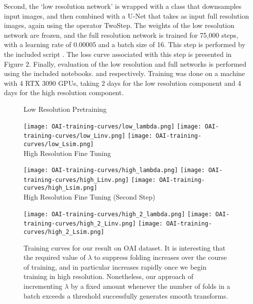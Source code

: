 Second, the `low resolution network' is wrapped with a class that downsamples input images, and then combined with a U-Net that takes as input full resolution images, again using the operator TwoStep. The weights of the low resolution network are frozen, and the full resolution network is trained for 75,000 steps, with a learning rate of $0.00005$ and a batch size of 16. This step is performed by the included script . The loss curve associated with this step is presented in Figure 2.
Finally, evaluation of the low resolution and full networks is performed using the included notebooks.   and  respectively. Training was done on a machine with 4 RTX 3090 GPUs, taking 2 days for the low resolution component and 4 days for the high resolution component.
\begin{figure}
    \centering
    Low Resolution Pretraining\par\medskip
    \texttt{[image: OAI-training-curves/low\_lambda.png]}
    \texttt{[image: OAI-training-curves/low\_Linv.png]}
    \texttt{[image: OAI-training-curves/low\_Lsim.png]} \\
    High Resolution Fine Tuning\par\medskip
    \texttt{[image: OAI-training-curves/high\_lambda.png]}
    \texttt{[image: OAI-training-curves/high\_Linv.png]}
    \texttt{[image: OAI-training-curves/high\_Lsim.png]} \\
    High Resolution Fine Tuning (Second Step)\par\medskip
    \texttt{[image: OAI-training-curves/high\_2\_lambda.png]}
    \texttt{[image: OAI-training-curves/high\_2\_Linv.png]}
    \texttt{[image: OAI-training-curves/high\_2\_Lsim.png]}
    \caption{Training curves for our result on OAI dataset. It is interesting that the required value of $\lambda$ to suppress folding increases over the course of training, and in particular increases rapidly once we begin training in high resolution. Nonetheless, our approach of incrementing $\lambda$ by a fixed amount whenever the number of folds in a batch exceeds a threshold successfully generates smooth transforms.}
    \label{fig:training_curves}
\end{figure}
\iffalse
